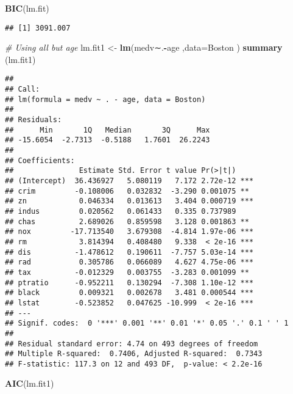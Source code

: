 \documentclass[]{article}
\newenvironment{Shaded}{\begin{snugshade}}{\end{snugshade}}
\newcommand{\CommentTok}[1]{\textcolor[rgb]{0.56,0.35,0.01}{\textit{#1}}}
\newcommand{\DataTypeTok}[1]{\textcolor[rgb]{0.13,0.29,0.53}{#1}}
\newcommand{\KeywordTok}[1]{\textcolor[rgb]{0.13,0.29,0.53}{\textbf{#1}}}
\newcommand{\NormalTok}[1]{#1}
\newcommand{\OperatorTok}[1]{\textcolor[rgb]{0.81,0.36,0.00}{\textbf{#1}}}
\newcommand{\StringTok}[1]{\textcolor[rgb]{0.31,0.60,0.02}{#1}}
\begin{document}
\begin{Shaded}
\begin{Highlighting}[]
\KeywordTok{BIC}\NormalTok{(lm.fit)}
\end{Highlighting}
\end{Shaded}

\begin{verbatim}
## [1] 3091.007
\end{verbatim}

\begin{Shaded}
\begin{Highlighting}[]
\CommentTok{# Using all but age}
\NormalTok{lm.fit1 <-}\StringTok{ }\KeywordTok{lm}\NormalTok{(medv∼.}\OperatorTok{-}\NormalTok{age ,}\DataTypeTok{data=}\NormalTok{Boston )}
\KeywordTok{summary}\NormalTok{ (lm.fit1)}
\end{Highlighting}
\end{Shaded}

\begin{verbatim}
## 
## Call:
## lm(formula = medv ~ . - age, data = Boston)
## 
## Residuals:
##      Min       1Q   Median       3Q      Max 
## -15.6054  -2.7313  -0.5188   1.7601  26.2243 
## 
## Coefficients:
##               Estimate Std. Error t value Pr(>|t|)    
## (Intercept)  36.436927   5.080119   7.172 2.72e-12 ***
## crim         -0.108006   0.032832  -3.290 0.001075 ** 
## zn            0.046334   0.013613   3.404 0.000719 ***
## indus         0.020562   0.061433   0.335 0.737989    
## chas          2.689026   0.859598   3.128 0.001863 ** 
## nox         -17.713540   3.679308  -4.814 1.97e-06 ***
## rm            3.814394   0.408480   9.338  < 2e-16 ***
## dis          -1.478612   0.190611  -7.757 5.03e-14 ***
## rad           0.305786   0.066089   4.627 4.75e-06 ***
## tax          -0.012329   0.003755  -3.283 0.001099 ** 
## ptratio      -0.952211   0.130294  -7.308 1.10e-12 ***
## black         0.009321   0.002678   3.481 0.000544 ***
## lstat        -0.523852   0.047625 -10.999  < 2e-16 ***
## ---
## Signif. codes:  0 '***' 0.001 '**' 0.01 '*' 0.05 '.' 0.1 ' ' 1
## 
## Residual standard error: 4.74 on 493 degrees of freedom
## Multiple R-squared:  0.7406, Adjusted R-squared:  0.7343 
## F-statistic: 117.3 on 12 and 493 DF,  p-value: < 2.2e-16
\end{verbatim}

\begin{Shaded}
\begin{Highlighting}[]
\KeywordTok{AIC}\NormalTok{(lm.fit1)}
\end{Highlighting}
\end{Shaded}
\end{document}
